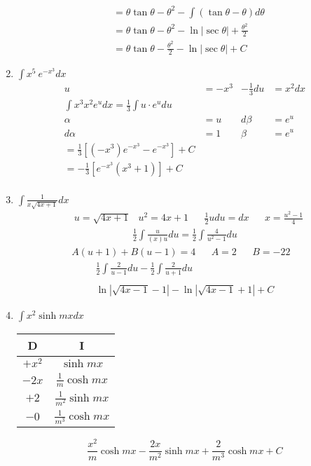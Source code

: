 \documentclass[12pt]{article}
\begin{document}
\begin{enumerate}
\begin{align*}
            &=\theta\tan\theta-\theta^2-\int (\tan\theta-\theta)d\theta \\
            &= \theta\tan\theta-\theta^2-\ln{|\sec{\theta}|}+\frac{\theta^2}{2} \\
            &= \theta\tan\theta-\frac{\theta^2}{2}-\ln{|\sec{\theta}|}+C             
        \end{align*}
    \addtocounter{enumi}{3}\item $\int x^5 \ e^{-x^3}dx$
        \begin{align*}
            u &= -x^3 &-\frac{1}{3}du &= x^2dx\\
            \int x^3x^2e^udx = \frac{1}{3}\int u\cdot e^u du\\
            \alpha &= u &d\beta &= e^u\\
            d\alpha &= 1 &\beta &= e^u\\
            =\frac{1}{3}\left[(-x^3)e^{-x^3} - e^{-x^3}\right] + C\\
            =-\frac{1}{3}\left[e^{-x^3}(x^3+1)\right] + C\\
        \end{align*}\newpage
    \addtocounter{enumi}{3}\item $\int\frac{1}{x\sqrt{4x+1}}dx$
        \begin{align*}
            &u = \sqrt{4x+1} & u^2=4x+1 && \frac{1}{2}udu=dx &&x=\frac{u^2-1}{4}
        \end{align*}
        \begin{align*}
            \frac{1}{2}\int\frac{u}{(x)u}du = \frac{1}{2}\int\frac{4}{u^2-1}du
        \end{align*}
        \begin{align*}
            A(u+1)+B(u-1)=4 && A = 2 && B = -22 &
        \end{align*}
        \begin{align*}
            \frac{1}{2}\int\frac{2}{u-1}du-\frac{1}{2}\int\frac{2}{u+1} du\\\\
            \ln{|\sqrt{4x-1}-1|} - \ln{|\sqrt{4x-1}+1|} + C             
        \end{align*}
    \addtocounter{enumi}{3}\item $\int x^2\sinh{mx}dx$\newline\newline
        \begin{tabular}{c|c}
            D & I \\\hline
            $+x^2$  & $\sinh{mx}$\\\hline
            $-2x$ & $\frac{1}{m}\cosh{mx}$\\\hline
            $+2$ & $\frac{1}{m^2}\sinh{mx}$\\\hline
            $-0$ & $\frac{1}{m^3}\cosh{mx}$\\\hline
        \end{tabular}
        \begin{equation*}
            \frac{x^2}{m}\cosh{mx}-\frac{2x}{m^2}\sinh{mx}+\frac{2}{m^3}\cosh{mx}+C
        \end{equation*}
\end{enumerate}

 

 
 
\end{document}
